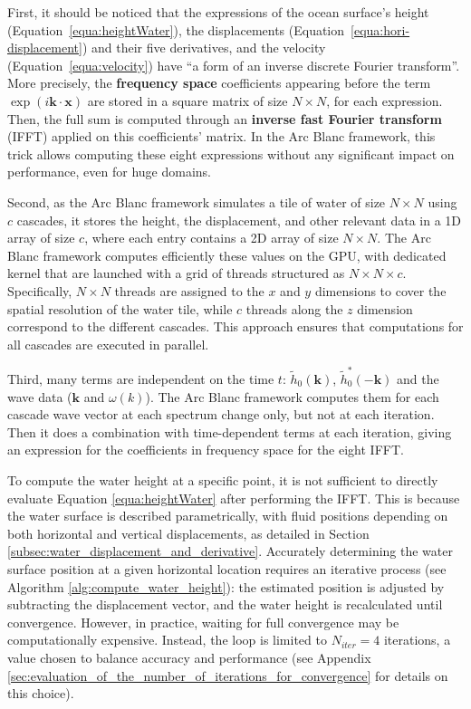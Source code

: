 \documentclass[11pt]{article}
\def\Framework{The Arc Blanc framework\xspace}
\def\framework{the Arc Blanc framework\xspace}
\begin{document}
First, it should be noticed that the expressions of the ocean surface's height (Equation~\ref{equa:heightWater}), the displacements (Equation~\ref{equa:hori-displacement}) and their five derivatives, and the velocity (Equation~\ref{equa:velocity}) have “a form of an inverse discrete Fourier transform”.
More precisely, the \textbf{frequency space} coefficients appearing before the term $\exp(i\mathbf{k}\cdot\mathbf x)$ are stored in a square matrix of size $N\times N$, for each expression.
Then, the full sum is computed through an \textbf{inverse fast Fourier transform} (IFFT) applied on this coefficients' matrix.
In \framework, this trick allows computing these eight expressions without any significant impact on performance, even for huge domains.

Second, as \framework simulates a tile of water of size $N\times N$ using $c$ cascades, it stores the height, the displacement, and other relevant data in a 1D array of size $c$, where each entry contains a 2D array of size $N\times N$. \Framework computes efficiently these values on the GPU, with dedicated kernel that are launched with a grid of threads structured as $N \times N \times c$. Specifically, $N \times N$ threads are assigned to the $x$ and $y$ dimensions to cover the spatial resolution of the water tile, while $c$ threads along the $z$ dimension correspond to the different cascades. This approach ensures that computations for all cascades are executed in parallel.

Third, many terms are independent on the time $t$: $\tilde{h}_0(\mathbf{k})$, $\tilde{h}_0^*(-\mathbf{k})$ and the wave data ($\mathbf{k}$ and $\omega(k)$).
\Framework computes them for each cascade wave vector at each spectrum change only, but not at each iteration.
Then it does a combination with time-dependent terms at each iteration, giving an expression for the coefficients in frequency space for the eight IFFT.


To compute the water height at a specific point, it is not sufficient to directly evaluate Equation \ref{equa:heightWater} after performing the IFFT. This is because the water surface is described parametrically, with fluid positions depending on both horizontal and vertical displacements, as detailed in Section \ref{subsec:water_displacement_and_derivative}. Accurately determining the water surface position at a given horizontal location requires an iterative process (see Algorithm \ref{alg:compute_water_height}): the estimated position is adjusted by subtracting the displacement vector, and the water height is recalculated until convergence. However, in practice, waiting for full convergence may be computationally expensive. Instead, the loop is limited to $N_{iter}=4$ iterations, a value chosen to balance accuracy and performance (see Appendix \ref{sec:evaluation_of_the_number_of_iterations_for_convergence} for details on this choice).
\end{document}
